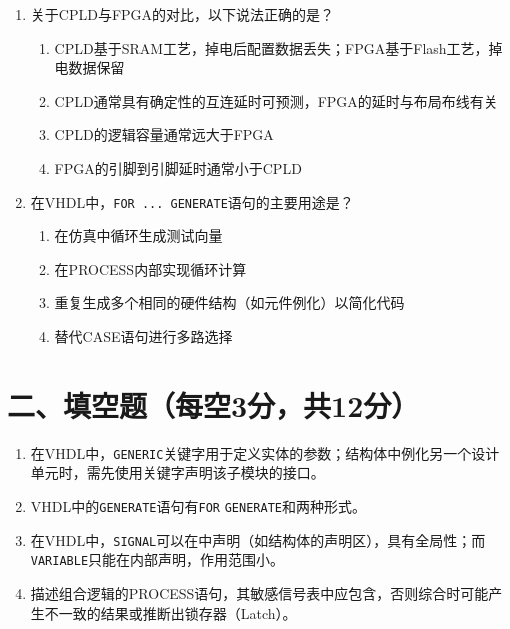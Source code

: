 \begin{enumerate}[label=\arabic*.]
\item 关于CPLD与FPGA的对比，以下说法正确的是？
\begin{enumerate}[label=\Alph*.]
  \item CPLD基于SRAM工艺，掉电后配置数据丢失；FPGA基于Flash工艺，掉电数据保留
  \item CPLD通常具有确定性的互连延时可预测，FPGA的延时与布局布线有关
  \item CPLD的逻辑容量通常远大于FPGA
  \item FPGA的引脚到引脚延时通常小于CPLD
\end{enumerate}

\item 在VHDL中，\texttt{FOR ... GENERATE}语句的主要用途是？
\begin{enumerate}[label=\Alph*.]
  \item 在仿真中循环生成测试向量
  \item 在PROCESS内部实现循环计算
  \item 重复生成多个相同的硬件结构（如元件例化）以简化代码
  \item 替代CASE语句进行多路选择
\end{enumerate}

\end{enumerate}

\section*{二、填空题（每空3分，共12分）}

\begin{enumerate}[label=\arabic*.]
\item 在VHDL中，\texttt{GENERIC}关键字用于定义实体的\underline{\hspace{2cm}}参数；结构体中例化另一个设计单元时，需先使用\underline{\hspace{2cm}}关键字声明该子模块的接口。

\item VHDL中的\texttt{GENERATE}语句有\texttt{FOR} \texttt{GENERATE}和\underline{\hspace{2.5cm}}两种形式。

\item 在VHDL中，\texttt{SIGNAL}可以在\underline{\hspace{2.5cm}}中声明（如结构体的声明区），具有全局性；而\texttt{VARIABLE}只能在\underline{\hspace{2.5cm}}内部声明，作用范围小。

\item 描述组合逻辑的PROCESS语句，其敏感信号表中应包含\underline{\hspace{3cm}}，否则综合时可能产生不一致的结果或推断出锁存器（Latch）。
\end{enumerate}

